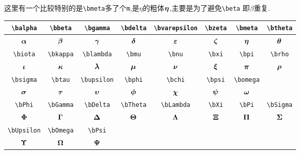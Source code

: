 \documentclass[lang=cn,12pt,scheme=chinese,mode=simple,black]{elegantbook}
\begin{document}
这里有一个比较特别的是\verb|\bmeta|多了个\verb|m|,是$\eta$的粗体$\bm{\eta}$,主要是为了避免\verb|\beta| 即$\beta$重复.
\begin{center}
    \renewcommand{\arraystretch}{1.4}
    \begin{tabular}{|c|c|c|c|c|c|c|c|}
        \hline\hline
        \verb|\balpha|   & \verb|\bbeta|  & \verb|\bgamma|   & \verb|\bdelta| & \verb|\bvarepsilon| & \verb|\bzeta| & \verb|\bmeta|  & \verb|\btheta| \\
        \hline
        $\bm{\alpha}$        & $\bm{\beta}$       & $\bm{\gamma}$        & $\bm{\delta}$      & $\bm{\varepsilon}$      & $\bm{\zeta}$      & $\bm{\eta}$       & $\bm{\theta}$      \\
        \hline\hline
        \verb|\biota|    & \verb|\bkappa| & \verb|\blambda|  & \verb|\bmu|    & \verb|\bnu|         & \verb|\bxi|   & \verb|\bpi|    & \verb|\brho|   \\
        \hline
        $\bm{\iota}$         & $\bm{\kappa}$      & $\bm{\lambda}$       & $\bm{\mu}$         & $\bm{\nu}$              & $\bm{\xi}$        & $\bm{\pi}$         & $\bm{\rho}$        \\
        \hline\hline
        \verb|\bsigma|   & \verb|\btau|   & \verb|\bupsilon| & \verb|\bphi|   & \verb|\bchi|        & \verb|\bpsi|  & \verb|\bomega| &                \\
        \hline
        $\bm{\sigma}$        & $\bm{\tau}$        & $\bm{\upsilon}$      & $\bm{\phi}$        & $\bm{\chi}$             & $\bm{\psi}$       & $\bm{\omega}$      &                \\
        \hline\hline
        \verb|\bPhi|     & \verb|\bGamma| & \verb|\bDelta|   & \verb|\bTheta| & \verb|\bLambda|     & \verb|\bXi|   & \verb|\bPi|    & \verb|\bSigma| \\
        \hline
        $\bm{\Phi}$          & $\bm{\Gamma}$      & $\bm{\Delta}$        & $\bm{\Theta}$      & $\bm{\Lambda}$          & $\bm{\Xi}$        & $\bm{\Pi}$         & $\bm{\Sigma}$      \\
        \hline\hline
        \verb|\bUpsilon| & \verb|\bOmega| & \verb|\bPsi|     &                &                     &               &                &                \\
        \hline
        $\bm{\Upsilon}$      & $\bm{\Omega}$      & $\bm{\Psi}$          &                &                     &               &                &                \\
        \hline\hline
    \end{tabular}
\end{center}
\end{document}
